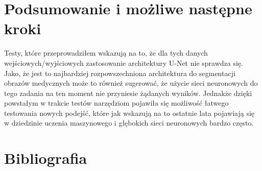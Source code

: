 \documentclass{article}
\begin{document}
\section{Podsumowanie i możliwe następne kroki}
Testy, które przeprowadziłem wskazują na to, że dla tych danych wejściowych/wyjściowych zastosowanie architektury U-Net nie sprawdza się.
Jako, że jest to najbardziej rozpowszechniona architektura do segmentacji obrazów medycznych może to również sugerować, że użycie sieci neuronowych do tego zadania na ten moment nie przyniesie żądanych wyników.
Jednakże dzięki powstałym w trakcie testów narzędziom pojawiła się możliwość łatwego testowania nowych podejść, które jak wskazują na to ostatnie lata pojawiają się w dziedzinie uczenia maszynowego i głębokich sieci neuronowych bardzo często.
\newpage
\section{Bibliografia}
\end{document}
